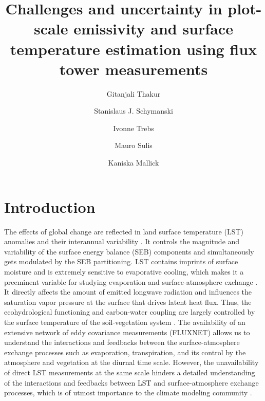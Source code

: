 \documentclass[fleqn,10pt]{wlscirep}
\title{ Challenges and uncertainty in plot-scale emissivity and surface temperature estimation using flux tower measurements}
\author[1,*]{Gitanjali Thakur}
\author[1,*]{ Stanislaus J. Schymanski}
\author[1]{Ivonne Trebs}
\author[1]{Mauro Sulis}
\author[1]{Kaniska Mallick }
\affil[1]{Luxembourg Institute of Science and Technology, ERIN, Belvaux, L-4422, Luxembourg}
\affil[*]{gitanjali.thakur90@gmail.com} %
\affil[*]{stanislaus.schymanski@list.lu}
\begin{document}
%

\flushbottom
\maketitle
%
%
\thispagestyle{empty}


\section*{Introduction}

The effects of global change are reflected in land surface temperature (LST) anomalies and their interannual variability \cite{rowell2005scenario}. It controls the magnitude and variability of the surface energy balance (SEB) components and simultaneously gets modulated by the SEB partitioning\cite{mallick2015reintroducing,timmermans2007intercomparison}. LST contains imprints of surface moisture and is extremely sensitive to evaporative cooling, which makes it a preeminent variable for studying evaporation and surface-atmosphere exchange \cite{mallick2018critical,trebs2021role,kustas2009advances}. It directly affects the amount of emitted longwave radiation and influences the saturation vapor pressure at the surface that drives latent heat flux. Thus, the ecohydrological functioning and carbon-water coupling are largely controlled by the surface temperature of the soil-vegetation system \cite{still2021imaging}.
 The availability of an extensive network of eddy covariance measurements (FLUXNET) allows us to understand the interactions and feedbacks between the surface-atmosphere exchange processes such as evaporation, transpiration, and its control by the atmosphere and vegetation at the diurnal time scale. However, the unavailability of direct LST measurements at the same scale hinders a detailed understanding of the interactions and feedbacks between LST and surface-atmosphere exchange processes, which is of utmost importance to the climate modeling community \cite{migliavacca2021three}.
\end{document}
